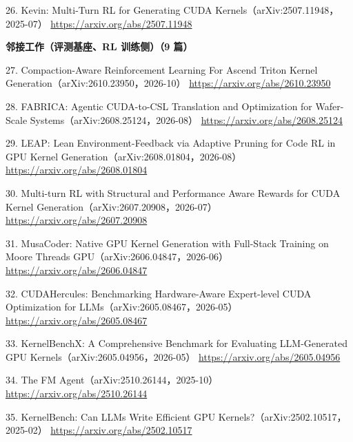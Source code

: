 \begin{refs}
26. Kevin: Multi-Turn RL for Generating CUDA Kernels（arXiv:2507.11948，2025-07）  
   \url{https://arxiv.org/abs/2507.11948}

\textbf{邻接工作（评测基座、RL 训练侧）（9 篇）}

27. Compaction-Aware Reinforcement Learning For Ascend Triton Kernel Generation（arXiv:2610.23950，2026-10）  
   \url{https://arxiv.org/abs/2610.23950}

28. FABRICA: Agentic CUDA-to-CSL Translation and Optimization for Wafer-Scale Systems（arXiv:2608.25124，2026-08）  
   \url{https://arxiv.org/abs/2608.25124}

29. LEAP: Lean Environment-Feedback via Adaptive Pruning for Code RL in GPU Kernel Generation（arXiv:2608.01804，2026-08）  
   \url{https://arxiv.org/abs/2608.01804}

30. Multi-turn RL with Structural and Performance Aware Rewards for CUDA Kernel Generation（arXiv:2607.20908，2026-07）  
   \url{https://arxiv.org/abs/2607.20908}

31. MusaCoder: Native GPU Kernel Generation with Full-Stack Training on Moore Threads GPU（arXiv:2606.04847，2026-06）  
   \url{https://arxiv.org/abs/2606.04847}

32. CUDAHercules: Benchmarking Hardware-Aware Expert-level CUDA Optimization for LLMs（arXiv:2605.08467，2026-05）  
   \url{https://arxiv.org/abs/2605.08467}

33. KernelBenchX: A Comprehensive Benchmark for Evaluating LLM-Generated GPU Kernels（arXiv:2605.04956，2026-05）  
   \url{https://arxiv.org/abs/2605.04956}

34. The FM Agent（arXiv:2510.26144，2025-10）  
   \url{https://arxiv.org/abs/2510.26144}

35. KernelBench: Can LLMs Write Efficient GPU Kernels?（arXiv:2502.10517，2025-02）  
   \url{https://arxiv.org/abs/2502.10517}
\end{refs}

